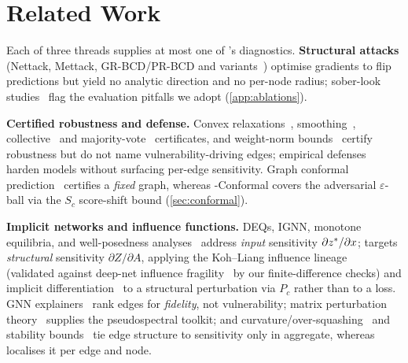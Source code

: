 \section{Related Work}
\label{sec:related}

Each of three threads supplies at most one of \AEGIS's diagnostics. \textbf{Structural attacks} (Nettack, Mettack, GR-BCD/PR-BCD and variants~\cite{zugner2018adversarial,zugner2019adversarial,geisler2021robustness,wu2019adversarial,xu2019topology}) optimise gradients to flip predictions but yield no analytic direction and no per-node radius; sober-look studies~\cite{mujkanovic2022defenses,gosch2023adversarial} flag the evaluation pitfalls we adopt (\cref{app:ablations}).

\textbf{Certified robustness and defense.} Convex relaxations~\cite{zugner2019certifiable}, smoothing~\cite{bojchevski2020efficient,bojchevski2019certifiable,schuchardt2023localized}, collective~\cite{schuchardt2021collective} and majority-vote~\cite{li2025agnncert} certificates, and weight-norm bounds~\cite{abbahaddou2024bounding} certify robustness but do not name vulnerability-driving edges; empirical defenses~\cite{zhu2019robust,jin2020graph,zhang2020gnnguard} harden models without surfacing per-edge sensitivity. Graph conformal prediction~\cite{zargarbashi2023conformal} certifies a \emph{fixed} graph, whereas \AEGIS-Conformal covers the adversarial $\varepsilon$-ball via the $S_c$ score-shift bound (\cref{sec:conformal}).

\textbf{Implicit networks and influence functions.} DEQs, IGNN, monotone equilibria, and well-posedness analyses~\cite{bai2019deep,gu2020implicit,winston2020monotone,el2021implicit} address \emph{input} sensitivity $\partial z^{*}/\partial x$; \AEGIS targets \emph{structural} sensitivity $\partial Z/\partial A$, applying the Koh--Liang influence lineage~\cite{koh2017understanding} (validated against deep-net influence fragility~\cite{basu2021influence} by our finite-difference checks) and implicit differentiation~\cite{lorraine2020optimizing,gould2021deep} to a structural perturbation via $P_c$ rather than to a loss. GNN explainers~\cite{ying2019gnnexplainer} rank edges for \emph{fidelity}, not vulnerability; matrix perturbation theory~\cite{stewart1990matrix,trefethen2005spectra} supplies the pseudospectral toolkit; and curvature/over-squashing~\cite{topping2022understanding,digiovanni2023oversquashing} and stability bounds~\cite{gama2020stability,kenlay2021stability} tie edge structure to sensitivity only in aggregate, whereas \AEGIS localises it per edge and node.
